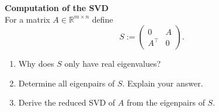 \textbf{Computation of the SVD}\\
For a matrix $A \in \mathbb{R}^{m\times n}$ define  
$$
S:=\begin{pmatrix}
0&A\\A^\top &0
\end{pmatrix}.
$$
\begin{enumerate}
    \item Why does $S$ only have real eigenvalues?
    \item Determine all eigenpairs of $S$. Explain your answer.
    \item Derive the reduced SVD of $A$ from the eigenpairs of $S$.
\end{enumerate}

